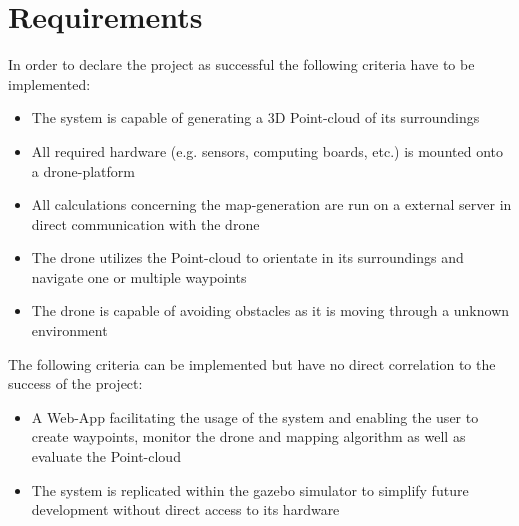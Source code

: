 \section{Requirements}
In order to declare the project as successful the following criteria have to be implemented:
\begin{itemize}
	\item The system is capable of generating a 3D Point-cloud of its surroundings
	\item All required hardware (e.g. sensors, computing boards, etc.) is mounted onto a drone-platform 
	\item All calculations concerning the map-generation are run on a external server in direct communication with the drone
	\item The drone utilizes the Point-cloud to orientate in its surroundings and navigate one or multiple waypoints
	\item The drone is capable of avoiding obstacles as it is moving through a unknown environment
\end{itemize}

The following criteria can be implemented but have no direct correlation to the success of the project:
\begin{itemize}
	\item A Web-App facilitating the usage of the system and enabling the user to create waypoints, monitor the drone and mapping algorithm as well as evaluate the Point-cloud
	\item The system is replicated within the gazebo simulator to simplify future development without direct access to its hardware
\end{itemize}


\filbreak
